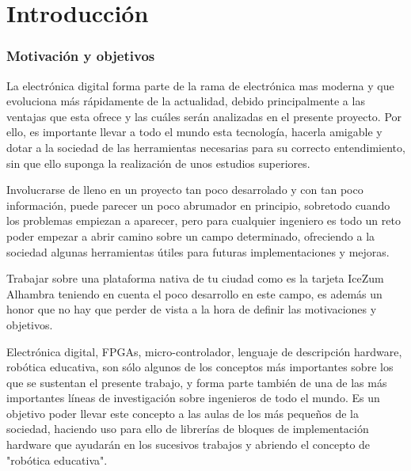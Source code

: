 \chapter{Introducción}\label{sec:intro}
\subsection{Motivación y objetivos}
La electrónica digital forma parte de la rama de electrónica mas moderna y que evoluciona más rápidamente de la actualidad, debido principalmente a las ventajas que esta ofrece y las cuáles serán analizadas en el presente proyecto. Por ello, es importante llevar a todo el mundo esta tecnología, hacerla amigable y dotar a la sociedad de las herramientas necesarias para su correcto entendimiento, sin que ello suponga la realización de unos estudios superiores. \newline

Involucrarse de lleno en un proyecto tan poco desarrolado y con tan poco información, puede parecer un poco abrumador en principio, sobretodo cuando los problemas empiezan a aparecer, pero para cualquier ingeniero es todo un reto poder empezar a abrir camino sobre un campo determinado, ofreciendo a la sociedad algunas herramientas útiles para futuras implementaciones y mejoras. \newline

Trabajar sobre una plataforma nativa de tu ciudad como es la tarjeta IceZum Alhambra teniendo en cuenta el poco desarrollo en este campo, es además un honor que no hay que perder de vista a la hora de definir las motivaciones y objetivos. \newline

Electrónica digital, FPGAs, micro-controlador, lenguaje de descripción hardware, robótica educativa, son sólo algunos de los conceptos más importantes sobre los que se sustentan el presente trabajo, y forma parte también de una de las más importantes líneas de investigación sobre ingenieros de todo el mundo. Es un objetivo poder llevar este concepto a las aulas de los más pequeños de la sociedad, haciendo uso para ello de librerías de bloques de implementación hardware que ayudarán en los sucesivos trabajos y abriendo el concepto de "robótica educativa". \newline


